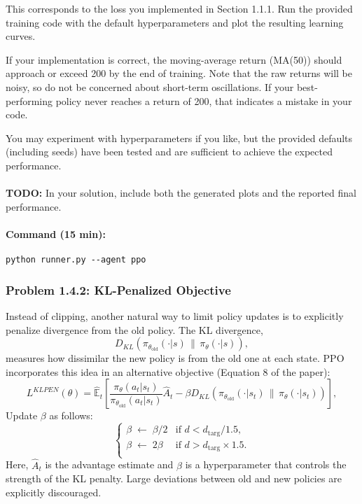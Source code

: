 \documentclass[12pt]{article}
\begin{document}
This corresponds to the loss you implemented in Section 1.1.1. Run the provided training code with the default hyperparameters and plot the resulting learning curves.  

If your implementation is correct, the moving-average return (MA(50)) should approach or exceed 200 by the end of training. Note that the raw returns will be noisy, so do not be concerned about short-term oscillations. If your best-performing policy never reaches a return of 200, that indicates a mistake in your code.  

You may experiment with hyperparameters if you like, but the provided defaults (including seeds) have been tested and are sufficient to achieve the expected performance.\\
\\
\noindent
\textbf{TODO:} In your solution, include both the generated plots and the reported final performance.

\paragraph{Command (15 min):}
\begin{verbatim}
python runner.py --agent ppo
\end{verbatim}


\begin{solution}[height=5cm]
\end{solution}

\subsubsection*{Problem 1.4.2: KL-Penalized Objective}

Instead of clipping, another natural way to limit policy updates is to explicitly penalize divergence from the old policy. The KL divergence,
\[
D_{KL}\!\left(\pi_{\theta_{\text{old}}}(\cdot|s) \,\|\, \pi_\theta(\cdot|s)\right),
\]
measures how dissimilar the new policy is from the old one at each state. PPO incorporates this idea in an alternative objective (Equation 8 of the paper):
\begin{equation}
L^{KLPEN}(\theta) = \hat{\mathbb{E}}_t \left[ \frac{\pi_\theta(a_t|s_t)}{\pi_{\theta_{\text{old}}}(a_t|s_t)} \hat{A}_t - \beta D_{KL}\!\left(\pi_{\theta_{\text{old}}}(\cdot|s_t) \,\|\, \pi_\theta(\cdot|s_t)\right) \right],
\end{equation}
Update $\beta$ as follows:
\[
\begin{cases}
\beta \;\leftarrow\; \beta/2 & \text{if } d < d_{\text{targ}} / 1.5, \\
\beta \;\leftarrow\; 2\beta & \text{if } d > d_{\text{targ}} \times 1.5. \\
\end{cases}
\]
\noindent
Here, $\hat{A}_t$ is the advantage estimate and $\beta$ is a hyperparameter that controls the strength of the KL penalty. Large deviations between old and new policies are explicitly discouraged.
\end{document}
